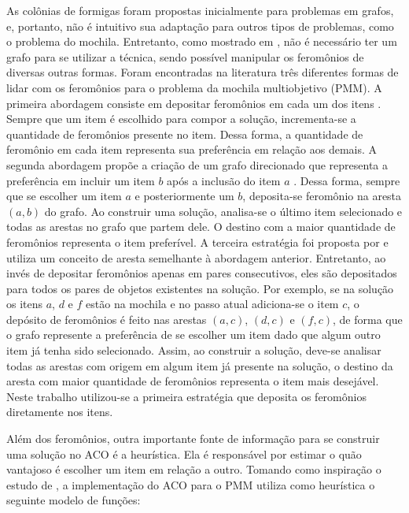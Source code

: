As colônias de formigas foram propostas inicialmente para problemas em grafos, e, portanto, não é intuitivo sua adaptação para outros tipos de problemas, como o problema do mochila. Entretanto, como mostrado em \cite{Ke2010}, não é necessário ter um grafo para se utilizar a técnica, sendo possível manipular os feromônios de diversas outras formas. Foram encontradas na literatura três diferentes formas de lidar com os feromônios para o problema da mochila multiobjetivo (PMM). A primeira abordagem consiste em depositar feromônios em cada um dos itens \cite{Leguizamon1999}. Sempre que um item é escolhido para compor a solução, incrementa-se a quantidade de feromônios presente no item. Dessa forma, a quantidade de feromônio em cada item representa sua preferência em relação aos demais. A segunda abordagem propõe a criação de um grafo direcionado que representa a preferência em incluir um item $b$ após a inclusão do item $a$ \cite{Fidanova2003}. Dessa forma, sempre que se escolher um item $a$ e posteriormente um $b$, deposita-se feromônio na aresta $(a,b)$ do grafo. Ao construir uma solução, analisa-se o último item selecionado e todas as arestas no grafo que partem dele. O destino com a maior quantidade de feromônios representa o item preferível. A terceira estratégia foi proposta por \cite{Alaya2004} e utiliza um conceito de aresta semelhante à abordagem anterior. Entretanto, ao invés de depositar feromônios apenas em pares consecutivos, eles são depositados para todos os pares de objetos existentes na solução. Por exemplo, se na solução os itens $a$, $d$ e $f$ estão na mochila e no passo atual adiciona-se o item $c$, o depósito de feromônios é feito nas arestas $(a,c)$, $(d,c)$ e $(f,c)$, de forma que o grafo represente a preferência de se escolher um item dado que algum outro item já tenha sido selecionado. Assim, ao construir a solução, deve-se analisar todas as arestas com origem em algum item já presente na solução, o destino da aresta com maior quantidade de feromônios representa o item mais desejável. Neste trabalho utilizou-se a primeira estratégia que deposita os feromônios diretamente nos itens.

Além dos feromônios, outra importante fonte de informação para se construir uma solução no ACO é a heurística. Ela é responsável por estimar o quão vantajoso é escolher um item em relação a outro. Tomando como inspiração o estudo de \cite{Ke2010}, a implementação do ACO para o PMM utiliza como heurística o seguinte modelo de funções:

